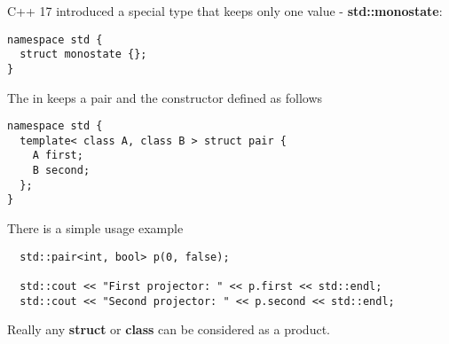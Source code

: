\begin{example}
\label{ex:cpp_terminal_object}
C++ 17 introduced a special type that keeps only one value -
\textbf{std::monostate}:  
\begin{verbatim}
namespace std {
  struct monostate {};
}
\end{verbatim}
\end{example}

\begin{example}[Product][\textbf{C++}]
\label{ex:cpp_product}
The  in  keeps a
pair and the constructor defined as follows
\begin{verbatim}
namespace std {
  template< class A, class B > struct pair {
    A first;
    B second;
  };
}
\end{verbatim}

There is a simple usage example
\begin{verbatim}
  std::pair<int, bool> p(0, false);

  std::cout << "First projector: " << p.first << std::endl;
  std::cout << "Second projector: " << p.second << std::endl;

\end{verbatim}
Really any \textbf{struct} or \textbf{class} can be
considered as a product. 
\end{example}


